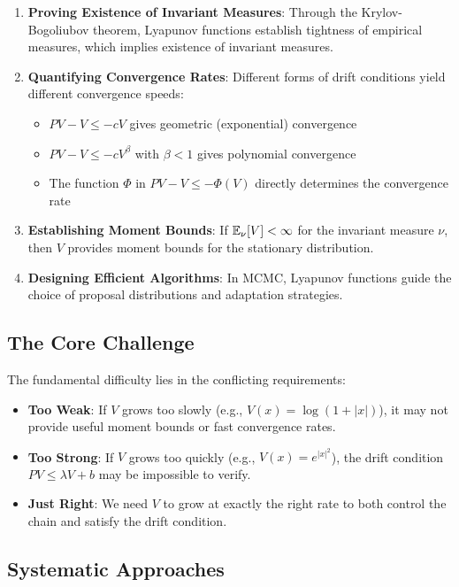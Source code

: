 \documentclass{amsart}
\let\originalmathbb\mathbb
\renewcommand{\mathbb}[1]{%
    \ifstrequal{#1}{1}{\mathbbm{#1}}{\originalmathbb{#1}}%
}
\theoremstyle{plain}
\theoremstyle{definition}
\theoremstyle{remark}
\begin{document}
\begin{enumerate}
	\item \textbf{Proving Existence of Invariant Measures}: Through the Krylov-Bogoliubov theorem, Lyapunov functions establish tightness of empirical measures, which implies existence of invariant measures.
	\item \textbf{Quantifying Convergence Rates}: Different forms of drift conditions yield different convergence speeds:
	\begin{itemize}
		\item $PV - V \leq -cV$ gives geometric (exponential) convergence
		\item $PV - V \leq -cV^{\beta}$ with $\beta < 1$ gives polynomial convergence
		\item The function $\Phi$ in $PV - V \leq -\Phi(V)$ directly determines the convergence rate
	\end{itemize}
	\item \textbf{Establishing Moment Bounds}: If $\mathbb{E}_\nu[V] < \infty$ for the invariant measure $\nu$, then $V$ provides moment bounds for the stationary distribution.
	\item \textbf{Designing Efficient Algorithms}: In MCMC, Lyapunov functions guide the choice of proposal distributions and adaptation strategies.
\end{enumerate}

\subsection{The Core Challenge}

The fundamental difficulty lies in the conflicting requirements:

\begin{itemize}
	\item \textbf{Too Weak}: If $V$ grows too slowly (e.g., $V(x) = \log(1 + |x|)$), it may not provide useful moment bounds or fast convergence rates.
	\item \textbf{Too Strong}: If $V$ grows too quickly (e.g., $V(x) = e^{|x|^2}$), the drift condition $PV \leq \lambda V + b$ may be impossible to verify.
	\item \textbf{Just Right}: We need $V$ to grow at exactly the right rate to both control the chain and satisfy the drift condition.
\end{itemize}

\subsection{Systematic Approaches}
\end{document}
